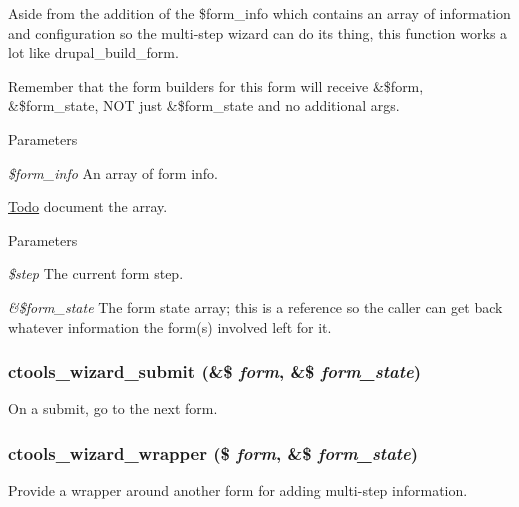 Aside from the addition of the \$form\_\-info which contains an array of information and configuration so the multi-\/step wizard can do its thing, this function works a lot like drupal\_\-build\_\-form.

Remember that the form builders for this form will receive \&\$form, \&\$form\_\-state, NOT just \&\$form\_\-state and no additional args.


\begin{DoxyParams}{Parameters}
\item[{\em \$form\_\-info}]An array of form info. \end{DoxyParams}
\begin{Desc}
\item[\hyperlink{todo__todo000008}{Todo}]document the array. \end{Desc}

\begin{DoxyParams}{Parameters}
\item[{\em \$step}]The current form step. \item[{\em \&\$form\_\-state}]The form state array; this is a reference so the caller can get back whatever information the form(s) involved left for it. \end{DoxyParams}
\hypertarget{wizard_8inc_a29fd9e85f0e0e87557a80b3b960a61d1}{
\subsubsection[{ctools\_\-wizard\_\-submit}]{\setlength{\rightskip}{0pt plus 5cm}ctools\_\-wizard\_\-submit (\&\$ {\em form}, \/  \&\$ {\em form\_\-state})}}
\label{wizard_8inc_a29fd9e85f0e0e87557a80b3b960a61d1}
On a submit, go to the next form. \hypertarget{wizard_8inc_a2373e7bfdb5d0ad17fcbe1802606dd46}{
\subsubsection[{ctools\_\-wizard\_\-wrapper}]{\setlength{\rightskip}{0pt plus 5cm}ctools\_\-wizard\_\-wrapper (\$ {\em form}, \/  \&\$ {\em form\_\-state})}}
\label{wizard_8inc_a2373e7bfdb5d0ad17fcbe1802606dd46}
Provide a wrapper around another form for adding multi-\/step information. 